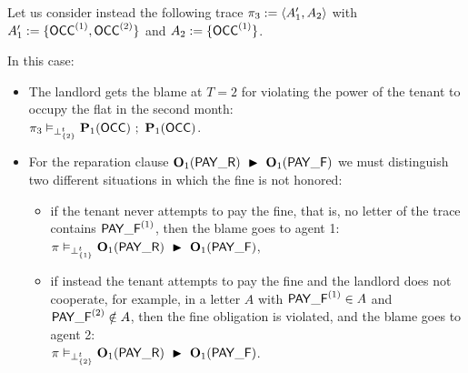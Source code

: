 \begin{example}
Let us consider instead the following trace $\pi_3:=\trace{A_1',A_2}$ with $A_1':= \{\OCC^{(1)}, \OCC^{(2)}\}$ and $A_2:= \{\OCC^{(1)}\}$.

In this case:
\begin{itemize}
\item The landlord gets the blame at $T=2$ for violating the power of the tenant to occupy the flat in the second month:\\
$\pi_3 \vDash_{\bottp{\{2\}}} \perm[1]{\OCC}\ ;\ \perm[1]{\OCC} $.
\item For the reparation clause $\obl[1]{\PAY}\ \repair\ \obl[1]{\PAYF}$ we must distinguish two different situations in which the fine is not honored:
  \begin{itemize}
    \item if the tenant never attempts to pay the fine, that is, no letter of the trace contains $\PAYF^{(1)}$, then the blame goes to agent 1:\\
    $\pi \vDash_{\bottp{\{1\}}} \obl[1]{\PAY}\ \repair\ \obl[1]{\PAYF}$,
    \item if instead the tenant attempts to pay the fine and the landlord does not cooperate, for example, in a letter $A$ with $\PAYF^{(1)}\in A$ and $\PAYF^{(2)}\notin A$, then the fine obligation is violated, and the blame goes to agent 2:\\
    $\pi \vDash_{\bottp{\{2\}}} \obl[1]{\PAY}\ \repair\ \obl[1]{\PAYF}$.
  \end{itemize}
\end{itemize}
\end{example}

